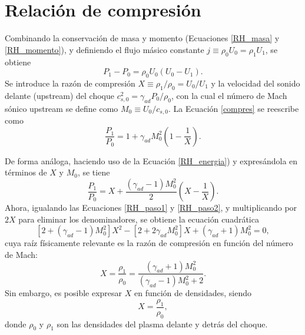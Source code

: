 \section{Relación de compresión}
\label{relacióncompresión}
Combinando la conservación de masa y momento (Ecuaciones \ref{RH_masa} y \ref{RH_momento}), y definiendo el flujo másico constante $j\equiv\rho_{0}U_{0}=\rho_{1}U_{1}$, se obtiene
\begin{equation}
    P_{1}-P_{0}=\rho_{0}U_{0}(U_{0}-U_{1}).
    \label{compres}
\end{equation}
Se introduce la razón de compresión $X\equiv\rho_{1}/\rho_{0}=U_{0}/U_{1}$ y la velocidad del sonido delante (upstream) del choque $c_{s,0}^{2}=\gamma_{ad}P_{0}/\rho_{0}$, con la cual el número de Mach sónico upstream se define como $M_{0}\equiv U_{0}/c_{s,0}$. La Ecuación \eqref{compres} se reescribe como
\begin{equation*}
    \frac{P_{1}}{P_{0}}=1+\gamma_{ad}M_{0}^{2}\left(1-\frac{1}{X}\right).
    \label{RH_paso1}
\end{equation*}

De forma análoga, haciendo uso de la Ecuación \eqref{RH_energia}) y expresándola en términos de $X$ y $M_{0}$, se tiene
\begin{equation}
    \frac{P_{1}}{P_{0}}=X+\frac{(\gamma_{ad}-1)M_{0}^{2}}{2}\left(X-\frac{1}{X}\right).
    \label{RH_paso2}
\end{equation}
Ahora, igualando las Ecuaciones \eqref{RH_paso1} y \eqref{RH_paso2}, y multiplicando por $2X$ para eliminar los denominadores, se obtiene la ecuación cuadrática
\begin{equation*}
    \left[2+(\gamma_{ad}-1)M_{0}^{2}\right]X^{2}-\left[2+2\gamma_{ad}M_{0}^{2}\right]X
    +(\gamma_{ad}+1)M_{0}^{2}=0,
\end{equation*}
cuya raíz físicamente relevante es la razón de compresión en función del número de Mach:
\begin{equation*}
    X=\frac{\rho_{1}}{\rho_{0}}=\frac{(\gamma_{ad}+1)M_{0}^{2}}{(\gamma_{ad}-1)M_{0}^{2}+2}.
    \label{Xcompresion}
\end{equation*}
Sin embargo, es posible expresar $X$ en función de densidades, siendo
\begin{equation}
X=\frac{\rho_1}{\rho_0},
\end{equation}
donde $\rho_0$ y $\rho_1$ son las densidades del plasma delante y detrás del choque.